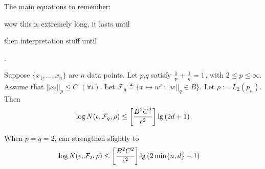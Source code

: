 \documentclass[11pt]{article}
\begin{document}
The main equations to remember:



\begin{comment}
\lecture{Lectures}{Asymptotic Analysis and Uniform Convergence}{September 22, 2021}


\lecture{Lectures}{Uniform Convergence Part 2 and Finite Hypothesis Class}{September 27, 2021}

\end{comment}






\begin{example}
	wow this is extremely long, it lasts until 
	
	then interpretation stuff until 
\end{example}


 . 

\begin{definition}
	Suppose $\{ x_1, \ldots, x_n \}$ are $n$ data points. Let  $p$,$q$ satisfy $\frac{1}{p} + \frac{1}{q} = 1$, with $2 \leq p \leq \infty$. Assume that $||x_i||_p \leq C$ $(\forall i)$. Let $\mathcal F_q \triangleq \{ x \mapsto w^x : ||w||_q \in B \}$. Let $\rho := L_2(p_n)$. Then
	\begin{align}
		\log N(\epsilon, \mathcal F_q, \rho)
			\leq \left[ \frac{B^2C^2}{\epsilon^2} \right] \lg \left(   2d + 1  \right)
	\end{align}

	When $p = q = 2$, can strengthen slightly to 
	\begin{align}
		\log N(\epsilon, \mathcal F_2, \rho)
			&\leq \left[    \frac{B^2C^2}{\epsilon^2} \right] \lg \left(   2 \min\{ n, d \} + 1  \right)
	\end{align}
\end{definition}
\end{document}
